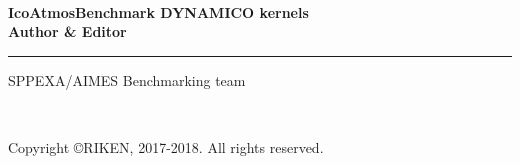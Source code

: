 \newpage
\thispagestyle{empty}

\mbox{\hspace*{1em}}\\

\vspace{10mm}
{\large{\bfseries IcoAtmosBenchmark DYNAMICO kernels}}\\

\vspace{10mm}
{\large{\bfseries Author \& Editor}}\\
\hrule width 90mm
\begin{tabbing}
SPPEXA/AIMES Benchmarking team\\
\end{tabbing}


\vspace{110mm}

\begin{flushright}
\\
\end{flushright}

\vspace{10mm}

\begin{flushright}
Copyright \copyright RIKEN, 2017-2018. All rights reserved.
\end{flushright}


